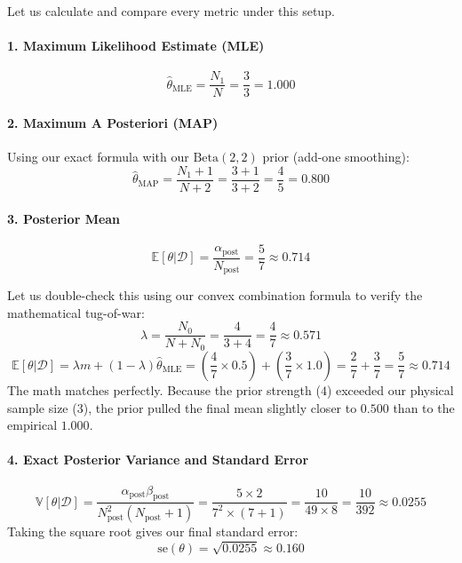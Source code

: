 \documentclass{article}
\begin{document}
Let us calculate and compare every metric under this setup.

\paragraph{1. Maximum Likelihood Estimate (MLE)}
\begin{equation}
\hat{\theta}_{\text{MLE}} = \frac{N_1}{N} = \frac{3}{3} = 1.000
\end{equation}

\paragraph{2. Maximum A Posteriori (MAP)}
Using our exact formula with our $\text{Beta}(2,2)$ prior (add-one smoothing):
\begin{equation}
\hat{\theta}_{\text{MAP}} = \frac{N_1 + 1}{N + 2} = \frac{3 + 1}{3 + 2} = \frac{4}{5} = 0.800
\end{equation}

\paragraph{3. Posterior Mean}
\begin{equation}
\mathbb{E}[\theta|\mathcal{D}] = \frac{\alpha_{\text{post}}}{N_{\text{post}}} = \frac{5}{7} \approx 0.714
\end{equation}

Let us double-check this using our convex combination formula to verify the mathematical tug-of-war:
\begin{equation}
\lambda = \frac{N_0}{N + N_0} = \frac{4}{3 + 4} = \frac{4}{7} \approx 0.571
\end{equation}
\begin{equation}
\mathbb{E}[\theta|\mathcal{D}] = \lambda m + (1 - \lambda)\hat{\theta}_{\text{MLE}} = \left(\frac{4}{7} \times 0.5\right) + \left(\frac{3}{7} \times 1.0\right) = \frac{2}{7} + \frac{3}{7} = \frac{5}{7} \approx 0.714
\end{equation}
The math matches perfectly. Because the prior strength ($4$) exceeded our physical sample size ($3$), the prior pulled the final mean slightly closer to $0.500$ than to the empirical $1.000$.

\paragraph{4. Exact Posterior Variance and Standard Error}
\begin{equation}
\mathbb{V}[\theta|\mathcal{D}] = \frac{\alpha_{\text{post}}\beta_{\text{post}}}{N_{\text{post}}^2(N_{\text{post}} + 1)} = \frac{5 \times 2}{7^2 \times (7 + 1)} = \frac{10}{49 \times 8} = \frac{10}{392} \approx 0.0255
\end{equation}
Taking the square root gives our final standard error:
\begin{equation}
\text{se}(\theta) = \sqrt{0.0255} \approx 0.160
\end{equation}
\end{document}
